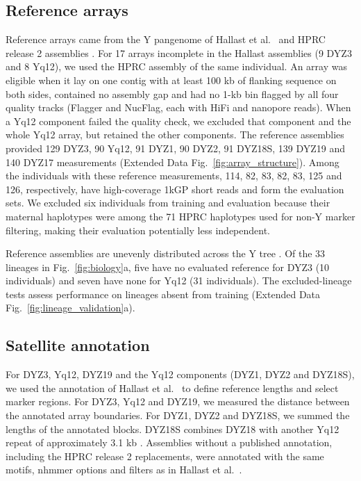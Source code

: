 
\subsection{Reference arrays}\label{sec:m-truth}
Reference arrays came from the Y pangenome of Hallast et al.\ \cite{Hallast2026} and HPRC release 2 assemblies \cite{Lucas2026}. For 17 arrays incomplete in the Hallast assemblies (9 DYZ3 and 8 Yq12), we used the HPRC assembly of the same individual. An array was eligible when it lay on one contig with at least 100 kb of flanking sequence on both sides, contained no assembly gap and had no 1-kb bin flagged by all four quality tracks (Flagger and NucFlag, each with HiFi and nanopore reads). When a Yq12 component failed the quality check, we excluded that component and the whole Yq12 array, but retained the other components. The reference assemblies provided 129 DYZ3, 90 Yq12, 91 DYZ1, 90 DYZ2, 91 DYZ18S, 139 DYZ19 and 140 DYZ17 measurements (Extended Data Fig.~\ref{fig:array_structure}). Among the individuals with these reference measurements, 114, 82, 83, 82, 83, 125 and 126, respectively, have high-coverage 1kGP short reads \cite{ByrskaBishop2022} and form the evaluation sets. We excluded six individuals from training and evaluation because their maternal haplotypes were among the 71 HPRC haplotypes used for non-Y marker filtering, making their evaluation potentially less independent.

Reference assemblies are unevenly distributed across the Y tree \cite{Hallast2026,Lucas2026}. Of the 33 lineages in Fig.~\ref{fig:biology}a, five have no evaluated reference for DYZ3 (10 individuals) and seven have none for Yq12 (31 individuals). The excluded-lineage tests assess performance on lineages absent from training (Extended Data Fig.~\ref{fig:lineage_validation}a).

\subsection{Satellite annotation}\label{sec:m-units}
For DYZ3, Yq12, DYZ19 and the Yq12 components (DYZ1, DYZ2 and DYZ18S), we used the annotation of Hallast et al.\ \cite{Hallast2026} to define reference lengths and select marker regions. For DYZ3, Yq12 and DYZ19, we measured the distance between the annotated array boundaries. For DYZ1, DYZ2 and DYZ18S, we summed the lengths of the annotated blocks. DYZ18S combines DYZ18 with another Yq12 repeat of approximately 3.1 kb \cite{Hallast2023}. Assemblies without a published annotation, including the HPRC release 2 replacements, were annotated with the same motifs, nhmmer \cite{Wheeler2013} options and filters as in Hallast et al.\ \cite{Hallast2026}.

